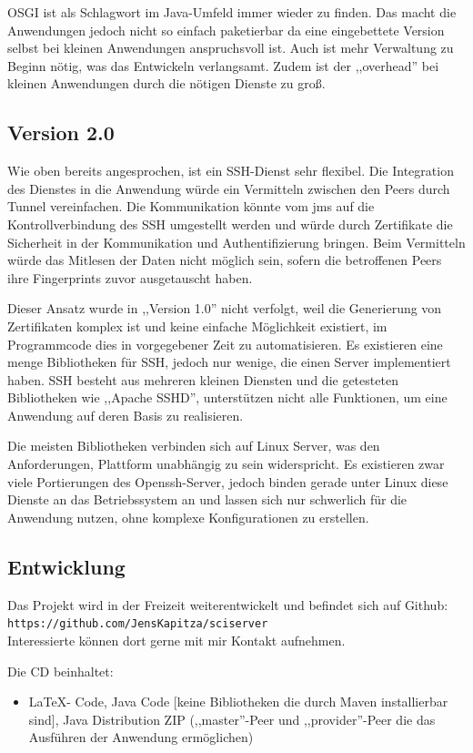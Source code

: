 \documentclass[oneside, ngerman, toc=bibliography,bibliography=totoc,listof=entryprefix, open=right,numbers=noenddot,fontsize=12pt]{scrbook}
\begin{document}
OSGI ist als Schlagwort im Java-Umfeld immer wieder zu finden. Das macht die Anwendungen jedoch nicht so einfach paketierbar da eine eingebettete Version selbst bei kleinen Anwendungen anspruchsvoll ist. Auch ist mehr Verwaltung zu Beginn nötig, was das Entwickeln verlangsamt. Zudem ist der ,,overhead'' bei kleinen Anwendungen durch die nötigen Dienste zu groß.

\subsection{Version 2.0}
Wie oben bereits angesprochen, ist ein SSH-Dienst sehr flexibel. Die Integration des Dienstes in die Anwendung würde ein Vermitteln zwischen den Peers durch Tunnel vereinfachen. Die Kommunikation könnte vom \acrshort{jms} auf die Kontrollverbindung des SSH umgestellt werden und würde durch Zertifikate die Sicherheit in der Kommunikation und Authentifizierung bringen. Beim Vermitteln würde das Mitlesen der Daten nicht möglich sein, sofern die betroffenen Peers ihre Fingerprints zuvor ausgetauscht haben.

Dieser Ansatz wurde in ,,Version 1.0'' nicht verfolgt, weil die Generierung von Zertifikaten komplex ist und keine einfache Möglichkeit existiert, im Programmcode dies in vorgegebener Zeit zu automatisieren.
Es existieren eine menge Bibliotheken für SSH, jedoch nur wenige, die einen Server implementiert haben.
SSH besteht aus mehreren kleinen Diensten und die getesteten Bibliotheken wie ,,Apache SSHD'', unterstützen nicht alle Funktionen, um eine Anwendung auf deren Basis zu realisieren.

Die meisten Bibliotheken verbinden sich auf Linux Server, was den Anforderungen, Plattform unabhängig zu sein widerspricht. Es existieren zwar viele Portierungen des Openssh-Server, jedoch binden gerade unter Linux diese Dienste an das Betriebssystem an und lassen sich nur schwerlich für die Anwendung nutzen, ohne komplexe Konfigurationen zu erstellen.

\subsection{Entwicklung}
Das Projekt wird in der Freizeit weiterentwickelt und befindet sich auf Github:\\
 \verb|https://github.com/JensKapitza/sciserver| \\ 
Interessierte können dort gerne mit mir Kontakt aufnehmen.

Die CD beinhaltet:
\begin{itemize}
    \item \LaTeX - Code, Java Code [keine Bibliotheken die durch Maven installierbar sind], Java Distribution ZIP (,,master''-Peer und ,,provider''-Peer die das Ausführen der Anwendung ermöglichen)
\end{itemize}
\end{document}
